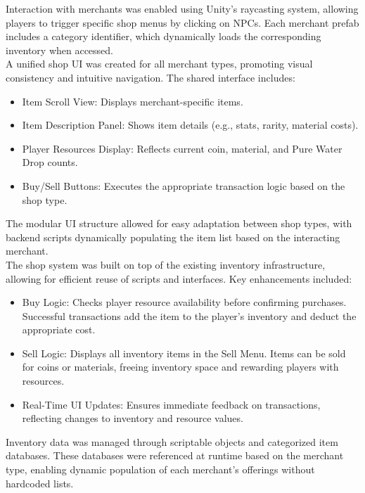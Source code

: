 \documentclass{article}
\begin{document}
Interaction with merchants was enabled using Unity's raycasting system, allowing players to trigger specific shop menus by clicking on NPCs. Each merchant prefab includes a category identifier, which dynamically loads the corresponding inventory when accessed.\\

A unified shop UI was created for all merchant types, promoting visual consistency and intuitive navigation. The shared interface includes:
\begin{itemize}
    \item Item Scroll View: Displays merchant-specific items.
    \item Item Description Panel: Shows item details (e.g., stats, rarity, material costs).
    \item Player Resources Display: Reflects current coin, material, and Pure Water Drop counts.
    \item Buy/Sell Buttons: Executes the appropriate transaction logic based on the shop type.
\end{itemize}

The modular UI structure allowed for easy adaptation between shop types, with backend scripts dynamically populating the item list based on the interacting merchant.\\

The shop system was built on top of the existing inventory infrastructure, allowing for efficient reuse of scripts and interfaces. Key enhancements included:
\begin{itemize}
    \item Buy Logic: Checks player resource availability before confirming purchases. Successful transactions add the item to the player's inventory and deduct the appropriate cost.
    \item Sell Logic: Displays all inventory items in the Sell Menu. Items can be sold for coins or materials, freeing inventory space and rewarding players with resources.
    \item Real-Time UI Updates: Ensures immediate feedback on transactions, reflecting changes to inventory and resource values.
\end{itemize}

Inventory data was managed through scriptable objects and categorized item databases. These databases were referenced at runtime based on the merchant type, enabling dynamic population of each merchant's offerings without hardcoded lists.\\
\end{document}
